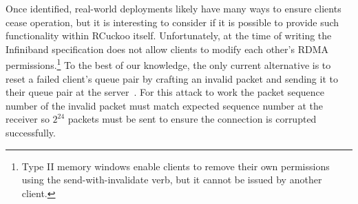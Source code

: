 Once identified, real-world deployments likely have many ways to
ensure clients cease operation, but it is interesting to consider if
it is possible to provide such functionality within RCuckoo
itself.  Unfortunately, at the time of writing the Infiniband
specification does not allow clients to modify each other's
RDMA permissions.\footnote{Type II memory windows enable clients to remove
their own permissions using the send-with-invalidate verb, but it
cannot be issued by another client.}
To the best of our knowledge, the only current alternative is to reset
a failed client's queue pair by crafting an invalid packet and
sending it to their queue pair at the server~\cite[Attack
  2]{redmark}. For this attack to work the packet sequence number of
the invalid packet must match expected sequence number at the receiver
so $2^{24}$ packets must be sent to ensure the connection is corrupted
successfully.
